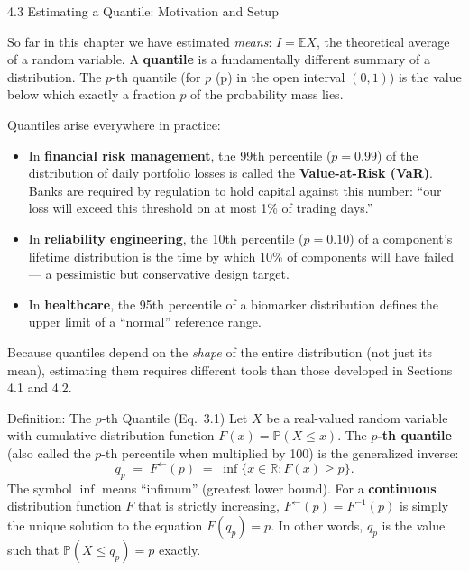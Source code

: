 \documentclass[aspectratio=169,10pt]{beamer}
\begin{document}
\begin{frame}[allowframebreaks]{4.3 Estimating a Quantile: Motivation and Setup}

So far in this chapter we have estimated \emph{means}: $I = \mathbb{E}X$, the
theoretical average of a random variable.  A \textbf{quantile} is a fundamentally
different summary of a distribution.  The $p$-th quantile (for $p$ (p) in the
open interval $(0,1)$) is the value below which exactly a fraction $p$ of the
probability mass lies.

Quantiles arise everywhere in practice:
\begin{itemize}
  \item In \textbf{financial risk management}, the 99th percentile ($p = 0.99$)
    of the distribution of daily portfolio losses is called the
    \textbf{Value-at-Risk (VaR)}.  Banks are required by regulation to hold capital
    against this number: ``our loss will exceed this threshold on at most 1\% of
    trading days.''
  \item In \textbf{reliability engineering}, the 10th percentile ($p = 0.10$) of
    a component's lifetime distribution is the time by which 10\% of components
    will have failed --- a pessimistic but conservative design target.
  \item In \textbf{healthcare}, the 95th percentile of a biomarker distribution
    defines the upper limit of a ``normal'' reference range.
\end{itemize}

Because quantiles depend on the \emph{shape} of the entire distribution (not just
its mean), estimating them requires different tools than those developed in
Sections 4.1 and 4.2.

\begin{block}{Definition: The $p$-th Quantile (Eq.\ 3.1)}
  Let $X$ be a real-valued random variable with cumulative distribution function
  $F(x) = \mathbb{P}(X \leq x)$.  The \textbf{$p$-th quantile} (also called the
  $p$-th percentile when multiplied by 100) is the generalized inverse:
  \[
    q_p \;=\; F^{\leftarrow}(p) \;=\; \inf\!\bigl\{x \in \mathbb{R} : F(x) \geq p\bigr\}.
  \]
  The symbol $\inf$ means ``infimum'' (greatest lower bound).  For a
  \textbf{continuous} distribution function $F$ that is strictly increasing,
  $F^{\leftarrow}(p) = F^{-1}(p)$ is simply the unique solution to the equation
  $F(q_p) = p$.  In other words, $q_p$ is the value such that
  $\mathbb{P}(X \leq q_p) = p$ exactly.
\end{block}


\end{frame}
\end{document}
